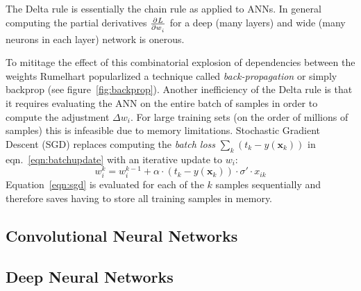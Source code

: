 The Delta rule is essentially the chain rule as applied to ANNs. 
%
In general computing the partial derivatives \(\pd{L}{w_i}\) for a deep (many layers) and wide (many neurons in each layer) network is onerous.
%

To mititage the effect of this combinatorial explosion of dependencies between the weights Rumelhart \etal\cite{rumelhart1988learning} popularlized a technique called \textit{back-propagation} or simply backprop (see figure~\ref{fig:backprop}).
%
Another inefficiency of the Delta rule is that it requires evaluating the ANN on the entire batch of samples in order to compute the adjustment \(\Delta w_i\).
%
For large training sets (on the order of millions of samples) this is infeasible due to memory limitations.
%
Stochastic Gradient Descent (SGD) replaces computing the \textit{batch loss} \(\sum_k(t_k-y(\mathbf{x}_k))\) in eqn.~\eqref{eqn:batchupdate} with an iterative update to \(w_i\):
\begin{equation}
    w_i^k = w_i^{k-1} + \alpha \cdot (t_k-y(\mathbf{x}_k))\cdot \sigma'\cdot x_{ik}
    \label{eqn:sgd}
\end{equation}
Equation~\eqref{eqn:sgd} is evaluated for each of the \(k\) samples sequentially and therefore saves having to store all training samples in memory.
\subsection{Convolutional Neural Networks}

\subsection{Deep Neural Networks}
